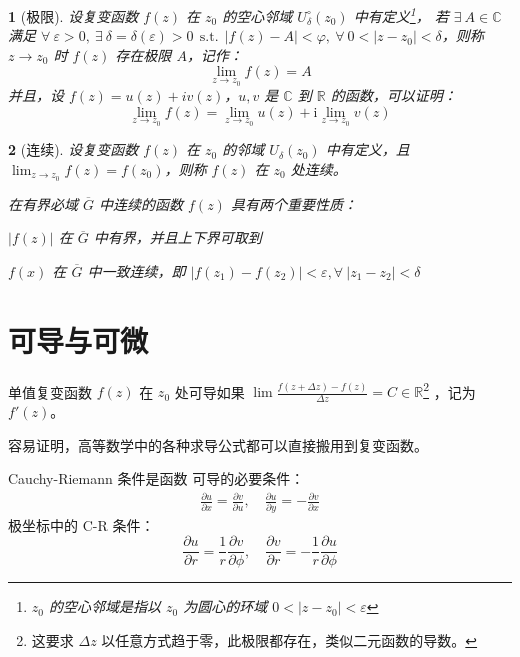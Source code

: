 \documentclass[UTF8]{report}
\def\R{\mathbb{R}}
\def\C{\mathbb{C}}
\theoremstyle{MyLineTheoremStyle} %
\theoremstyle{MyBlockTheoremStyle} %
\theoremstyle{MySubsubsectionStyle} %
\newtheorem{definition}{}
\begin{document}
\begin{definition}[极限]
设复变函数 $f(z)$ 在 $z_0$ 的空心邻域 $U^\circ_{\delta}(z_0)$ 中有定义\footnote{$z_0$ 的空心邻域是指以 $z_0$ 为圆心的环域 $0 < | z - z_0 | < \varepsilon$}，
若 $\exists\ A \in \C $ 满足 $ \forall\ \varepsilon > 0,\ \exists\ \delta = \delta(\varepsilon)>0 \ \ \text{s.t.}\ \ | f(z) - A |<\varphi,\ \forall\ 0<| z - z_0 |<\delta $，则称 $z \to z_0$ 时 $f(z)$ 存在极限 $A$，记作：
\begin{equation}
\lim_{z \to z_0}f(z) = A
\end{equation} 
并且，设 $f(z) = u(z) + iv(z)$，$u,v$ 是 $\C$ 到 $\R$ 的函数，可以证明：
\begin{equation}
\lim_{z \to z_0}f(z) = \lim_{z \to z_0}u(z) + \mathrm{i}  \lim_{z \to z_0}v(z)
\end{equation} 
\end{definition}


\begin{definition}[连续]
设复变函数 $f(z)$ 在 $z_0$ 的邻域 $U_{\delta}(z_0)$ 中有定义，且 $ \lim_{z\to z_0}f(z) = f(z_0)$，则称 $f(z)$ 在 $z_0$ 处连续。

在有界必域 $\overline{G}$ 中连续的函数 $f(z)$ 具有两个重要性质：
\begin{circledenum}[leftmargin=4em]
\item  $ | f(z) | $ 在 $\overline{G}$ 中有界，并且上下界可取到
\item $f(x)$ 在 $\overline{G}$ 中一致连续，即 $| f(z_1) - f(z_2) | < \varepsilon, \forall\ | z_1 - z_2 | < \delta $
\end{circledenum}
\end{definition}


\section{可导与可微}



单值复变函数 $f(z)$ 在 $z_0$ 处可导如果 $\lim\frac{f(z + \Delta z) - f(z)}{\Delta z} = C \in \R$\footnote{这要求 $\Delta z$ 以任意方式趋于零，此极限都存在，类似二元函数的导数。}
，记为 $f'(z)$。


容易证明，高等数学中的各种求导公式都可以直接搬用到复变函数。

Cauchy-Riemann 条件是函数{\color{red} 可导的必要条件}：
\begin{gather}
\frac{\partial u }{\partial x } = \frac{\partial v }{\partial u },\quad
\frac{\partial u }{\partial y } = - \frac{\partial v }{\partial x }
\end{gather}
极坐标中的 C-R 条件：
\begin{equation}
\frac{\partial u }{\partial r } = \frac{1}{r}\frac{\partial v }{\partial \phi },\quad \frac{\partial v }{\partial r } = - \frac{1}{r}\frac{\partial u }{\partial \phi }
\end{equation}
\end{document}

